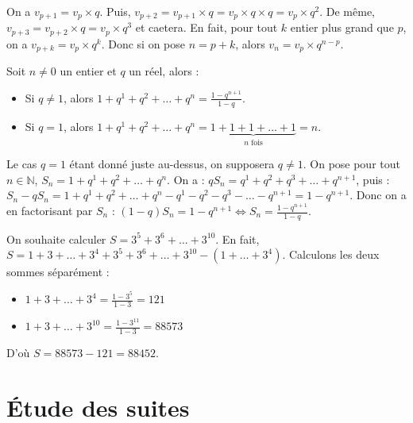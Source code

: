 	\begin{demonstration}
		On a $v_{p+1} = v_p \times q$. Puis, $v_{p+2} = v_{p+1} \times q = v_p \times q \times q = v_p \times q^2$. De même, $v_{p+3} = v_{p+2} \times q = v_p \times q^3$  et caetera.
		\newline
		En fait, pour tout $k$ entier plus grand que $p$, on a $v_{p+k} = v_p \times q^k$.
		\newline
		Donc si on pose $n = p+k$, alors $v_n = v_p \times q^{n-p}$.
	\end{demonstration}
	
	\begin{formula}
		Soit $n \neq 0$ un entier et $q$ un réel, alors :
		\begin{itemize}
			\item Si $q \neq 1$, alors $1 + q^1 + q^2 + \dots + q^n = \frac{1 - q^{n + 1}}{1 - q}$.
			\item Si $q = 1$, alors $1 + q^1 + q^2 + \dots + q^n = \underbrace{1 + 1 + 1 + \dots + 1}_{n \text{ fois}} = n$.
		\end{itemize}
	\end{formula}
	
	\begin{demonstration}
		Le cas $q = 1$ étant donné juste au-dessus, on supposera $q \neq 1$. On pose pour tout $n \in \mathbb{N}$, $S_n = 1 + q^1 + q^2 + \dots + q^n$.
		\newpar
		On a : $qS_n = q^1 + q^2 + q^3 + \dots + q^{n+1}$, puis : $S_n - qS_n = 1 + q^1 + q^2 + \dots + q^n - q^1 - q^2 - q^3 - \dots - q^{n+1} = 1 - q^{n+1}$.
		\newpar
		Donc on a en factorisant par $S_n$ : $(1 - q)S_n = 1 - q^{n+1} \iff S_n = \frac{1 - q^{n+1}}{1 - q}$.
	\end{demonstration}
	
	\begin{tip}[Exemple]
		On souhaite calculer $S = 3^5 + 3^6 + \dots + 3^{10}$.
		\newpar
		En fait, $S = 1 + 3 + \dots + 3^4 + 3^5 + 3^6 + \dots + 3^{10} - (1 + \dots + 3^4)$. Calculons les deux sommes séparément :
		\begin{itemize}
			\item $1 + 3 + \dots + 3^4 = \frac{1 - 3^5}{1 - 3} = 121$
			\item $1 + 3 + \dots + 3^{10} = \frac{1 - 3^{11}}{1 - 3} = 88573$
		\end{itemize}
		D'où $S = 88573 - 121 = 88452$.
	\end{tip}
	
	\section{Étude des suites}
	
